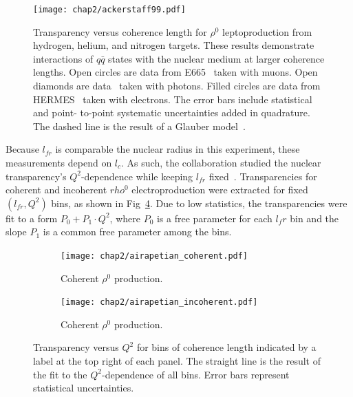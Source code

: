 \begin{figure}[!h]
    \centering
    \texttt{[image: chap2/ackerstaff99.pdf]}
    \caption[Transparency versus coherence length for $\rho^0$ leptoproduction
             from hydrogen, helium, and nitrogen targets.]{Transparency versus coherence length for $\rho^0$ leptoproduction
             from hydrogen, helium, and nitrogen targets.
             These results demonstrate interactions of $q\bar{q}$ states with
             the nuclear medium at larger coherence lengths.
             Open circles are data from E665~\cite{Adams_1995} taken with muons.
             Open diamonds are data~\cite{McClellan_1969} taken with photons.
             Filled circles are data from HERMES~\cite{Ackerstaff_1999} taken
             with electrons.
             The error bars include statistical and point- to-point systematic
             uncertainties added in quadrature.
             The dashed line is the result of a Glauber model~\cite{Hufner_1996}.
            }
    \label{fig:ackerstaff99}
\end{figure}


Because $l_{fr}$ is comparable the nuclear radius in this experiment, these
measurements depend on $l_c$.
As such, the collaboration studied the nuclear transparency's $Q^2$-dependence
while keeping $l_{fr}$ fixed~\cite{Airapetian_2003}.
Transparencies for coherent and incoherent $rho^0$ electroproduction were
extracted for fixed $(l_{fr},Q^2)$ bins, as shown in
Fig~\ref{fig:airapetian_T_vs_lfr}.
Due to low statistics, the transparencies were fit to a form
$P_0 + P_1 \cdot Q^2$, where $P_0$ is a free parameter for each $l_fr$ bin and
the slope $P_1$ is a common free parameter among the bins.

\begin{figure}[!h]
    \centering
    \begin{subfigure}[b]{0.475\textwidth}
        \centering
        \texttt{[image: chap2/airapetian\_coherent.pdf]}
        \caption{Coherent $\rho^0$ production.}
        \label{fig:airapetian_coherent}
    \end{subfigure}
    \begin{subfigure}[b]{0.475\textwidth}
        \centering
        \texttt{[image: chap2/airapetian\_incoherent.pdf]}
        \caption{Coherent $\rho^0$ production.}
        \label{fig:airapetian_incoherent}
    \end{subfigure}
    \caption[ Transparency versus $Q^2$ for bins of coherence length]{
             Transparency versus $Q^2$ for bins of coherence length
             indicated by a label at the top right of each panel.
             The straight line is the result of the fit to the $Q^2$-dependence
             of all bins.
             Error bars represent statistical uncertainties.
            }
    \label{fig:airapetian_T_vs_lfr}
\end{figure}

